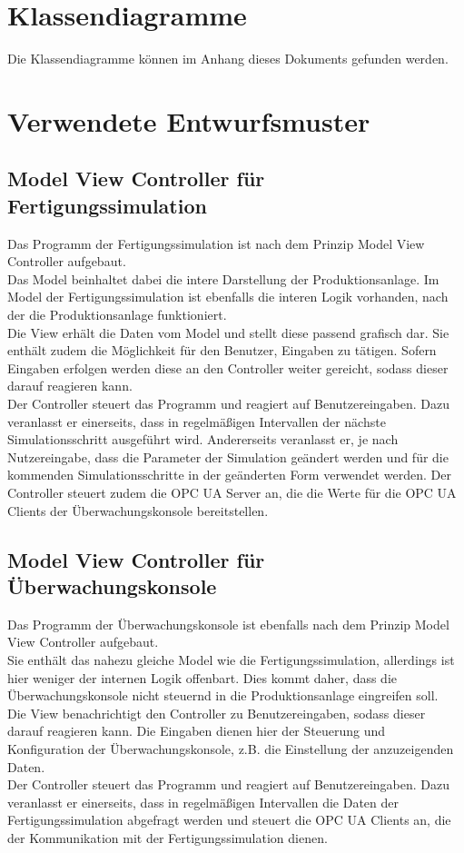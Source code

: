 \documentclass[parskip=full]{scrartcl}
\begin{document}
\section{Klassendiagramme}
Die Klassendiagramme können im Anhang dieses Dokuments gefunden werden.

\pagebreak
\section{Verwendete Entwurfsmuster}
\subsection{Model View Controller f\"ur Fertigungssimulation}
Das Programm der Fertigungssimulation ist nach dem Prinzip Model View Controller aufgebaut.\\
Das Model beinhaltet dabei die intere Darstellung der Produktionsanlage. Im Model der Fertigungssimulation ist ebenfalls die interen Logik
vorhanden, nach der die Produktionsanlage funktioniert. \\
Die View erh\"alt die Daten vom Model und stellt diese passend grafisch dar. Sie enth\"alt zudem die M\"oglichkeit f\"ur den Benutzer, Eingaben zu
t\"atigen. Sofern Eingaben erfolgen werden diese an den Controller weiter gereicht, sodass dieser darauf reagieren kann.\\
Der Controller steuert das Programm und reagiert auf Benutzereingaben. Dazu veranlasst er einerseits, dass in regelm\"a{\ss}igen Intervallen der
n\"achste Simulationsschritt ausgef\"uhrt wird. Andererseits veranlasst er, je nach Nutzereingabe, dass die Parameter der Simulation ge\"andert werden
und f\"ur die kommenden Simulationsschritte in der ge\"anderten Form verwendet werden. Der Controller steuert zudem die OPC UA Server an, die die
Werte f\"ur die OPC UA Clients der \"Uberwachungskonsole bereitstellen.

\subsection{Model View Controller f\"ur \"Uberwachungskonsole}
Das Programm der \"Uberwachungskonsole ist ebenfalls nach dem Prinzip Model View Controller aufgebaut.\\
Sie enth\"alt das nahezu gleiche Model wie die Fertigungssimulation, allerdings ist hier weniger der internen Logik offenbart. Dies kommt daher, dass
die \"Uberwachungskonsole nicht steuernd in die Produktionsanlage eingreifen soll. \\
Die View benachrichtigt den Controller zu Benutzereingaben, sodass dieser darauf reagieren kann. Die Eingaben dienen hier der Steuerung und Konfiguration
der \"Uberwachungskonsole, z.B. die Einstellung der anzuzeigenden Daten.\\
Der Controller steuert das Programm und reagiert auf Benutzereingaben. Dazu veranlasst er einerseits, dass in regelm\"a{\ss}igen Intervallen die Daten der
Fertigungssimulation abgefragt werden und steuert die OPC UA Clients an, die der Kommunikation mit der Fertigungssimulation dienen.
\end{document}
